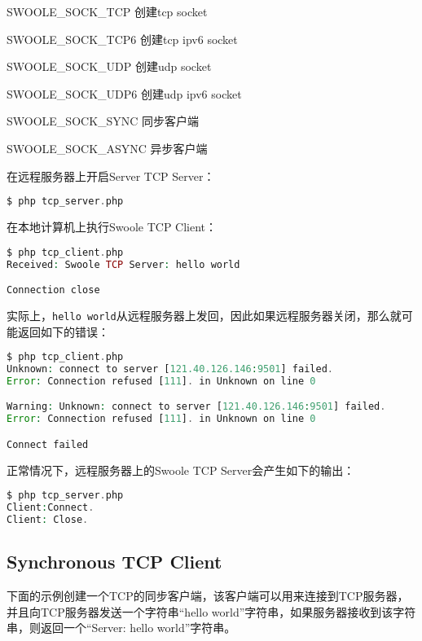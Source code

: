 \begin{compactitem}
\item SWOOLE\_SOCK\_TCP 创建tcp socket
\item SWOOLE\_SOCK\_TCP6 创建tcp ipv6 socket
\item SWOOLE\_SOCK\_UDP 创建udp socket
\item SWOOLE\_SOCK\_UDP6 创建udp ipv6 socket
\item SWOOLE\_SOCK\_SYNC 同步客户端
\item SWOOLE\_SOCK\_ASYNC 异步客户端
\end{compactitem}



在远程服务器上开启Server TCP Server：

\begin{lstlisting}[language=PHP]
$ php tcp_server.php
\end{lstlisting}

在本地计算机上执行Swoole TCP Client：

\begin{lstlisting}[language=PHP]
$ php tcp_client.php
Received: Swoole TCP Server: hello world

Connection close
\end{lstlisting}

实际上，\texttt{hello world}从远程服务器上发回，因此如果远程服务器关闭，那么就可能返回如下的错误：

\begin{lstlisting}[language=PHP]
$ php tcp_client.php
Unknown: connect to server [121.40.126.146:9501] failed. 
Error: Connection refused [111]. in Unknown on line 0

Warning: Unknown: connect to server [121.40.126.146:9501] failed. 
Error: Connection refused [111]. in Unknown on line 0

Connect failed
\end{lstlisting}

正常情况下，远程服务器上的Swoole TCP Server会产生如下的输出：


\begin{lstlisting}[language=PHP]
$ php tcp_server.php 
Client:Connect.
Client: Close.
\end{lstlisting}


\subsection{Synchronous TCP Client}


下面的示例创建一个TCP的同步客户端，该客户端可以用来连接到TCP服务器，并且向TCP服务器发送一个字符串“hello world”字符串，如果服务器接收到该字符串，则返回一个“Server: hello world”字符串。



